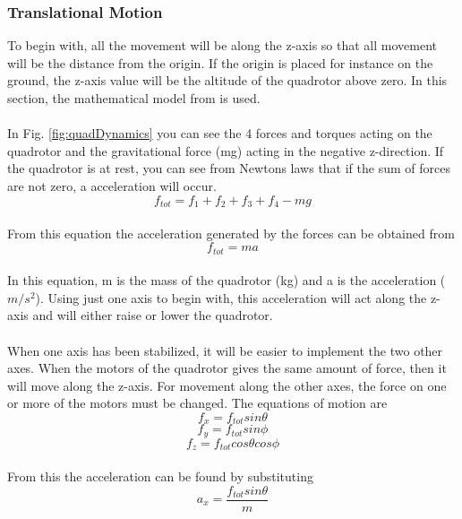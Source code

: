 \subsubsection{Translational Motion}
To begin with, all the movement will be along the z-axis so that all movement will be the distance from the origin. If the origin is placed for instance on the ground, the z-axis value will be the altitude of the quadrotor above zero. In this section, the mathematical model from \cite{charlesdarwinuni} is used. 
\\\\
In Fig. \ref{fig:quadDynamics} you can see the 4 forces and torques acting on the quadrotor and the gravitational force (mg) acting in the negative z-direction. If the quadrotor is at rest, you can see from Newtons laws that if the sum of forces are not zero, a acceleration will occur. 
\begin{equation}
  f_{tot} = f_1 + f_2 + f_3 + f_4 - mg
\end{equation}
\\
From this equation the acceleration generated by the forces can be obtained from  
\\
\begin{equation}
  f_{tot} = ma
\end{equation}
\\
In this equation, m is the mass of the quadrotor (kg) and a is the acceleration ($m/s^2$). Using just one axis to begin with, this acceleration will act along the z-axis and will either raise or lower the quadrotor. 
\\\\
When one axis has been stabilized, it will be easier to implement the two other axes. When the motors of the quadrotor gives the same amount of force, then it will move along the z-axis. For movement along the other axes, the force on one or more of the motors must be changed. The equations of motion are
\\
\begin{equation}
f_x = f_{tot}sin\theta
\end{equation}
\begin{equation}
f_y = f_{tot}sin\phi
\end{equation}
\begin{equation}
f_z = f_{tot}cos\theta cos\phi
\end{equation}
\\
From this the acceleration can be found by substituting
\\
\begin{equation}
a_x = \frac{f_{tot}sin\theta}{m}
\end{equation}
